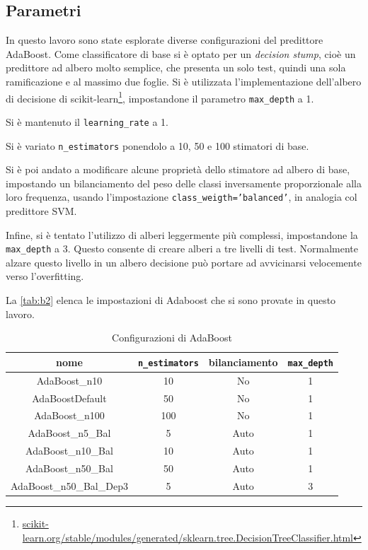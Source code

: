 \documentclass[12pt,a4paper,oneside,hidelinks]{report}
\begin{document}
\subsection{Parametri}
In questo lavoro sono state esplorate diverse configurazioni del predittore AdaBoost.
Come classificatore di base si è optato per un \emph{decision stump}, cioè un predittore ad albero molto semplice, che presenta un solo test, quindi una sola ramificazione e al massimo due foglie. Si è utilizzata l'implementazione dell'albero di decisione di scikit-learn\footnote{\url{scikit-learn.org/stable/modules/generated/sklearn.tree.DecisionTreeClassifier.html}}, impostandone il parametro \texttt{max\_depth} a 1.

Si è mantenuto il \texttt{learning\_rate} a 1. 

Si è variato \texttt{n\_estimators} ponendolo a 10, 50 e 100 stimatori di base.

Si è poi andato a modificare alcune proprietà dello stimatore ad albero di base, impostando un bilanciamento del peso delle classi inversamente proporzionale alla loro frequenza, usando l'impostazione \texttt{class\_weigth='balanced'}, in analogia col predittore SVM.

Infine, si è tentato l'utilizzo di alberi leggermente più complessi, impostandone la \texttt{max\_depth} a 3. Questo consente di creare alberi a tre livelli di test. Normalmente alzare questo livello in un albero decisione può portare ad avvicinarsi velocemente verso l'overfitting.

La \autoref{tab:b2} elenca le impostazioni di Adaboost che si sono provate in questo lavoro.

\begin{table}[ht]%
\centering
\caption{Configurazioni di AdaBoost}\label{tab:b2}
\begin{tabular}{|c|c|c|c|}
\hline
nome & \texttt{n\_estimators} & bilanciamento & \texttt{max\_depth} \\ 
\hline 
AdaBoost\_n10 & 10 & No & 1 \\ 
\hline 
AdaBoostDefault & 50 & No & 1 \\ 
\hline 
AdaBoost\_n100 & 100 & No & 1 \\ 
\hline 
AdaBoost\_n5\_Bal & 5 & Auto & 1 \\ 
\hline 
AdaBoost\_n10\_Bal & 10 & Auto & 1 \\ 
\hline 
AdaBoost\_n50\_Bal & 50 & Auto & 1 \\ 
\hline 
AdaBoost\_n50\_Bal\_Dep3 & 5 & Auto &  3\\ 
\hline 
\end{tabular} 
\end{table}
\end{document}
